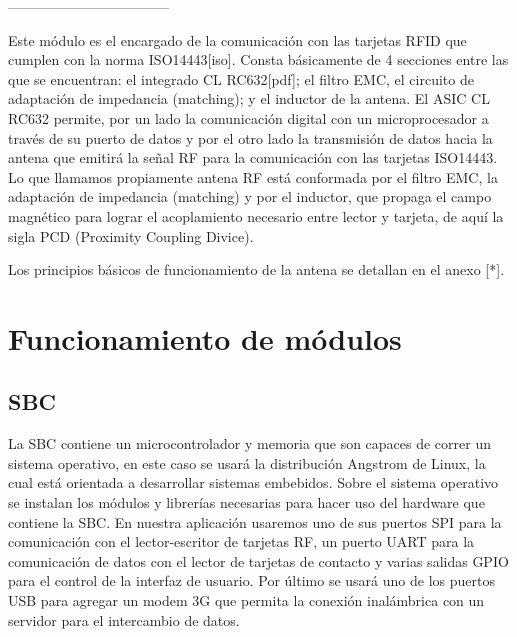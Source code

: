 \bigskip
-----------------------------------
\bigskip

	Este módulo es el encargado de la comunicación con las tarjetas RFID que cumplen con la norma ISO14443[iso]. Consta básicamente de 4 secciones entre las que se encuentran: el integrado CL RC632[pdf]; el filtro EMC, el circuito de adaptación de impedancia (matching); y el inductor de la antena. 
El ASIC CL RC632 permite, por un lado la comunicación digital con un microprocesador a través de su puerto de datos y por el otro lado la transmisión de datos hacia la antena que emitirá la señal RF para la comunicación con las tarjetas ISO14443. 
Lo que llamamos propiamente antena RF está conformada por el filtro EMC, la adaptación de impedancia (matching) y por el inductor, que propaga el campo magnético para lograr el acoplamiento necesario entre lector y tarjeta, de aquí la sigla PCD (Proximity Coupling Divice).

Los principios básicos de funcionamiento de la antena se detallan en el anexo [*].

\section{Funcionamiento de m\'odulos}

\subsection{SBC}
La SBC contiene un microcontrolador y memoria que son capaces de correr un
sistema operativo, en este caso se usará la distribución Angstrom de Linux, la cual
está orientada a desarrollar sistemas embebidos. Sobre el sistema operativo se
instalan los módulos y librerías necesarias para hacer uso del hardware que contiene
la SBC. En nuestra aplicación usaremos uno de sus puertos SPI para la comunicación
con el lector-escritor de tarjetas RF, un puerto UART para la comunicación de datos
con el lector de tarjetas de contacto y varias salidas GPIO para el control de la
interfaz de usuario. Por último se usará uno de los puertos USB para agregar un
modem 3G que permita la conexión inalámbrica con un servidor para el intercambio
de datos.

